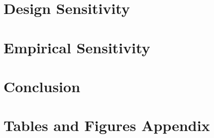 \documentclass[12pt]{article}
\begin{document}
\section{Design Sensitivity \label{sec:dsens}}


\section{Empirical Sensitivity \label{sec:esens}}


\section{Conclusion \label{sec:conclusion}}


\clearpage
\singlespacing




\newpage
\appendix
\section*{Tables and Figures Appendix}
\FloatBarrier


\end{document}
